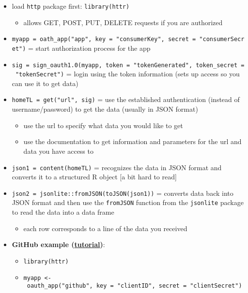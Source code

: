 \documentclass[
]{article}
\providecommand{\tightlist}{%
  \setlength{\itemsep}{0pt}\setlength{\parskip}{0pt}}
\begin{document}
\begin{itemize}
\tightlist
\item
  load \texttt{http} package first: \texttt{library(httr)}

  \begin{itemize}
  \tightlist
  \item
    allows GET, POST, PUT, DELETE requests if you are authorized
  \end{itemize}
\item
  \texttt{myapp\ =\ oath\_app("app",\ key\ =\ "consumerKey",\ secret\ =\ "consumerSecret")}
  = start authorization process for the app
\item
  \texttt{sig\ =\ sign\_oauth1.0(myapp,\ token\ =\ "tokenGenerated",\ token\_secret\ =\ "tokenSecret")}
  = login using the token information (sets up access so you can use it
  to get data)
\item
  \texttt{homeTL\ =\ get("url",\ sig)} = use the established
  authentication (instead of username/password) to get the data (usually
  in JSON format)

  \begin{itemize}
  \tightlist
  \item
    use the url to specify what data you would like to get
  \item
    use the documentation to get information and parameters for the url
    and data you have access to
  \end{itemize}
\item
  \texttt{json1\ =\ content(homeTL)} = recognizes the data in JSON
  format and converts it to a structured R object {[}a bit hard to
  read{]}
\item
  \texttt{json2\ =\ jsonlite::fromJSON(toJSON(json1))} = converts data
  back into JSON format and then use the \texttt{fromJSON} function from
  the \texttt{jsonlite} package to read the data into a data frame

  \begin{itemize}
  \tightlist
  \item
    each row corresponds to a line of the data you received
  \end{itemize}
\item
  \textbf{GitHub example
  (\href{https://github.com/hadley/httr/blob/master/demo/oauth2-github.r}{tutorial})}:

  \begin{itemize}
  \tightlist
  \item
    \texttt{library(httr)}
  \item
    \texttt{myapp\ \textless{}-\ oauth\_app("github",\ key\ =\ "clientID",\ secret\ =\ "clientSecret")}


\end{itemize}
\end{itemize}
\end{document}
